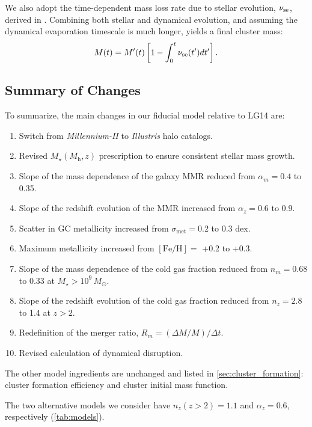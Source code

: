 \documentclass[fleqn,usenatbib]{mnras}
\newcommand{\Mh}{M_{\mathrm{h}}}
\newcommand{\Msun}{\,M_{\odot}}
\newcommand{\Mstar}{M_{\star}}
\newcommand{\feh}{\mathrm{[Fe/H]}}
\begin{document}
We also adopt the time-dependent mass loss rate due to stellar evolution, $\nu_{\rm se}$, derived in \cite{prieto_gnedin08}. Combining both stellar and dynamical evolution, and assuming the dynamical evaporation timescale is much longer, yields a final cluster mass:
\begin{align}
  M(t) = M'(t) \left[ 1 - \int_0^t \nu_{\rm se}(t')dt' \right].
\end{align}

\subsection{Summary of Changes}

To summarize, the main changes in our fiducial model relative to LG14 are:
\begin{enumerate}
\item Switch from \textit{Millennium-II} to \textit{Illustris} halo catalogs.
\item Revised $\Mstar(\Mh,z)$ prescription to ensure consistent stellar mass growth.
\item Slope of the mass dependence of the galaxy MMR reduced from $\alpha_m = 0.4$ to 0.35.
\item Slope of the redshift evolution of the MMR increased from $\alpha_z = 0.6$ to 0.9.
\item Scatter in GC metallicity increased from $\sigma_{\mathrm{met}} = 0.2$ to 0.3 dex.
\item Maximum metallicity increased from $\feh=$ +0.2 to +0.3.
\item Slope of the mass dependence of the cold gas fraction reduced from $n_m = 0.68$ to 0.33 at $\Mstar > 10^{9}\Msun$.
\item Slope of the redshift evolution of the cold gas fraction reduced from $n_z = 2.8$ to 1.4 at $z>2$.
\item Redefinition of the merger ratio, $R_m = (\Delta M/M)/\Delta t$.
\item Revised calculation of dynamical disruption.
\end{enumerate}
The other model ingredients are unchanged and listed in \autoref{sec:cluster_formation}: cluster formation efficiency and cluster initial mass function.

The two alternative models we consider have $n_z(z>2) = 1.1$ and $\alpha_z = 0.6$, respectively (\autoref{tab:models}).
\end{document}
